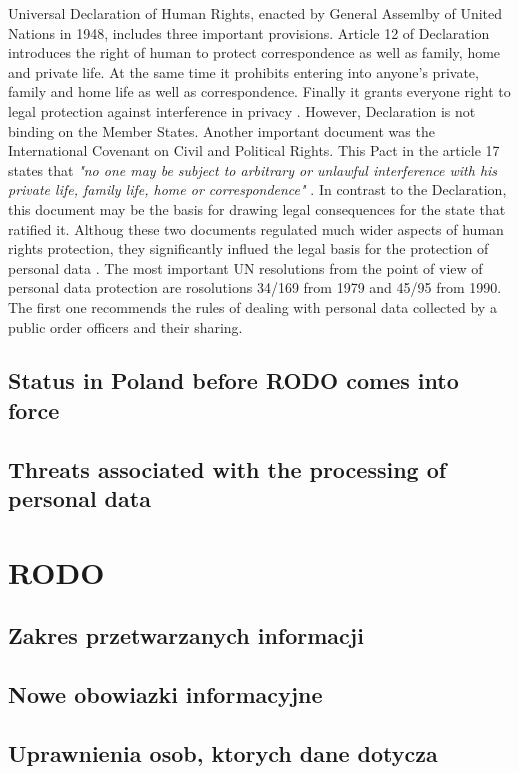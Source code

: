 \documentclass[en, noamssymb]{mgr}
\begin{document}
\indent Universal Declaration of Human Rights, enacted by General Assemlby of United Nations in 1948, includes three important provisions. Article 12 of Declaration introduces the right of human to protect correspondence as well as family, home and private life. At the same time it prohibits entering into anyone's private, family and home life as well as correspondence. Finally it grants everyone right to legal protection against interference in privacy \cite{prawo_odo}. However, Declaration is not binding on the Member States. Another important document was the International Covenant on Civil and Political Rights. This Pact in the article 17 states that \textit{"no one may be subject to arbitrary or unlawful interference with his private life, family life, home or correspondence"} \cite{prawo_odo}. In contrast to the Declaration, this document may be the basis for drawing legal consequences for the state that ratified it. Althoug these two documents regulated much wider aspects of human rights protection, they significantly influed the legal basis for the protection of personal data \cite{prawo_odo}. The most important UN resolutions from the point of view of personal data protection are rosolutions 34/169 from 1979 and 45/95 from 1990. The first one recommends the rules of dealing with personal data collected by a public order officers and their sharing.  

\section{Status in Poland before RODO comes into force}
\section{Threats associated with the processing of personal data}

\chapter{RODO} \label{sec:sekcjaRODO}
\section{Zakres przetwarzanych informacji}
\section{Nowe obowiazki informacyjne}
\section{Uprawnienia osob, ktorych dane dotycza}
\end{document}
